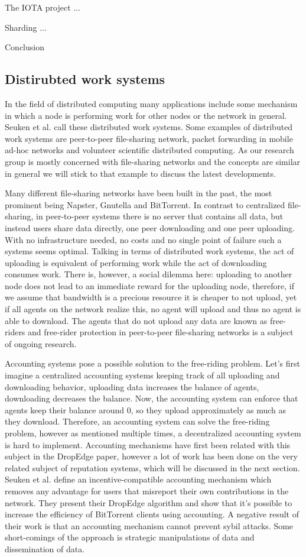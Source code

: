 The IOTA project ...

Sharding ...

Conclusion


\subsection{Distirubted work systems}
In the field of distributed computing many applications include some mechanism in which a node is
performing work for other nodes or the network in general. Seuken et al. call these distributed 
work systems. Some examples of distributed work systems are peer-to-peer file-sharing network,
packet forwarding in mobile ad-hoc networks and volunteer scientific distributed computing. As our 
research group is mostly concerned with file-sharing networks and the concepts are similar in 
general we will stick to that example to discuss the latest developments.

Many different file-sharing networks have been built in the past, the most prominent being Napster,
Gnutella and BitTorrent. In contrast to centralized file-sharing, in peer-to-peer systems there is 
no server that contains all data, but instead users share data directly, one peer downloading and 
one peer uploading. With no infrastructure needed, no costs and no single point of failure such a
systems seems optimal. Talking in terms of distributed work systems, the act of uploading is 
equivalent of performing work while the act of downloading consumes work. There is, however, a 
social dilemma here: uploading to another node does not lead to an immediate reward for the
uploading node, therefore, if we assume that bandwidth is a precious resource it is cheaper to not 
upload, yet if all agents on the network realize this, no agent will upload and thus no agent is 
able to download. The agents that do not upload any data are known as free-riders and free-rider 
protection in peer-to-peer file-sharing networks is a subject of ongoing research.

Accounting systems pose a possible solution to the free-riding problem. Let's first imagine a 
centralized accounting systems keeping track of all uploading and downloading behavior, uploading 
data increases the balance of agents, downloading decreases the balance. Now, the accounting system
can enforce that agents keep their balance around 0, so they upload approximately as much as they
download. Therefore, an accounting system can solve the free-riding problem, however as mentioned 
multiple times, a decentralized accounting system is hard to implement. Accounting mechanisms have
first been related with this subject in the DropEdge paper, however a lot of work has been done on
the very related subject of reputation systems, which will be discussed in the next section. Seuken
et al. define an incentive-compatible accounting mechanism which removes any advantage for users 
that misreport their own contributions in the network. They present their DropEdge algorithm and 
show that it's possible to increase the efficiency of BitTorrent clients using accounting. A 
negative result of their work is that an accounting mechanism cannot prevent sybil attacks. Some
short-comings of the approach is strategic manipulations of data and dissemination of data. 

